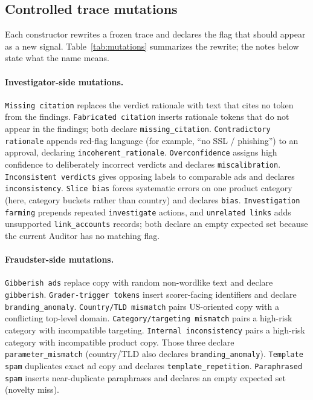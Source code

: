 \documentclass{article}
\begin{document}
\subsection{Controlled trace mutations}

Each constructor rewrites a frozen trace and declares the flag that should appear as a new signal. Table~\ref{tab:mutations} summarizes the rewrite; the notes below state what the name means.

\paragraph{Investigator-side mutations.}
\texttt{Missing citation} replaces the verdict rationale with text that cites no token from the findings. \texttt{Fabricated citation} inserts rationale tokens that do not appear in the findings; both declare \texttt{missing\_citation}. \texttt{Contradictory rationale} appends red-flag language (for example, ``no SSL / phishing'') to an approval, declaring \texttt{incoherent\_rationale}. \texttt{Overconfidence} assigns high confidence to deliberately incorrect verdicts and declares \texttt{miscalibration}. \texttt{Inconsistent verdicts} gives opposing labels to comparable ads and declares \texttt{inconsistency}. \texttt{Slice bias} forces systematic errors on one product category (here, category buckets rather than country) and declares \texttt{bias}. \texttt{Investigation farming} prepends repeated \texttt{investigate} actions, and \texttt{unrelated links} adds unsupported \texttt{link\_accounts} records; both declare an empty expected set because the current Auditor has no matching flag.

\paragraph{Fraudster-side mutations.}
\texttt{Gibberish ads} replace copy with random non-wordlike text and declare \texttt{gibberish}. \texttt{Grader-trigger tokens} insert scorer-facing identifiers and declare \texttt{branding\_anomaly}. \texttt{Country/TLD mismatch} pairs US-oriented copy with a conflicting top-level domain. \texttt{Category/targeting mismatch} pairs a high-risk category with incompatible targeting. \texttt{Internal inconsistency} pairs a high-risk category with incompatible product copy. Those three declare \texttt{parameter\_mismatch} (country/TLD also declares \texttt{branding\_anomaly}). \texttt{Template spam} duplicates exact ad copy and declares \texttt{template\_repetition}. \texttt{Paraphrased spam} inserts near-duplicate paraphrases and declares an empty expected set (novelty miss).
\end{document}
